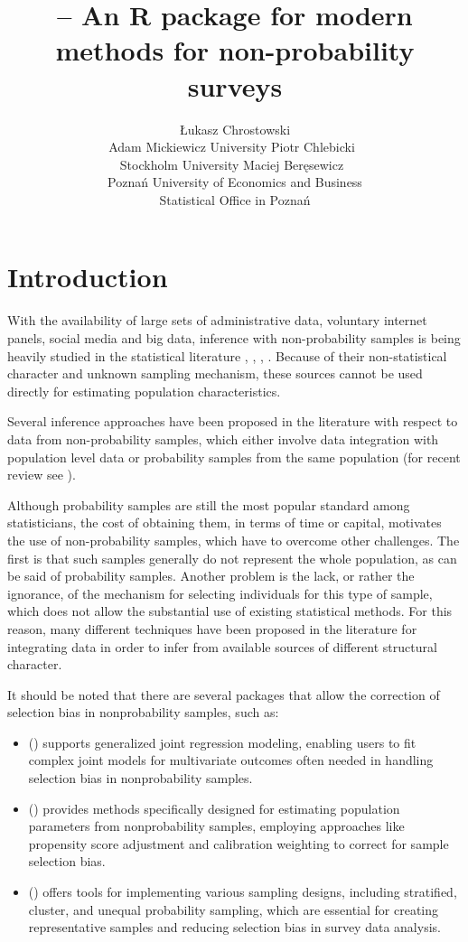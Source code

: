 \documentclass[
]{jss}
\author{
Łukasz Chrostowski\\Adam Mickiewicz University \And Piotr
Chlebicki~\orcidlink{0009-0006-4867-7434}\\Stockholm University
\AND Maciej Beręsewicz~\orcidlink{0000-0002-8281-4301}\\Poznań
University of Economics and Business\\
Statistical Office in Poznań
}
\title{\pkg{nonprobsvy} -- An R package for modern methods for
non-probability surveys}
\begin{document}
\section{Introduction}\label{introduction}

With the availability of large sets of administrative data, voluntary
internet panels, social media and big data, inference with
non-probability samples is being heavily studied in the statistical
literature \cite{beaumont2020probability},
\cite{elliott_inference_2017}, \cite{berkesewicz2017two},
\cite{citro2014multiple}. Because of their non-statistical character and
unknown sampling mechanism, these sources cannot be used directly for
estimating population characteristics.

Several inference approaches have been proposed in the literature with
respect to data from non-probability samples, which either involve data
integration with population level data or probability samples from the
same population (for recent review see \cite{wu2022statistical}).

Although probability samples are still the most popular standard among
statisticians, the cost of obtaining them, in terms of time or capital,
motivates the use of non-probability samples, which have to overcome
other challenges. The first is that such samples generally do not
represent the whole population, as can be said of probability samples.
Another problem is the lack, or rather the ignorance, of the mechanism
for selecting individuals for this type of sample, which does not allow
the substantial use of existing statistical methods. For this reason,
many different techniques have been proposed in the literature for
integrating data in order to infer from available sources of different
structural character.

It should be noted that there are several packages that allow the
correction of selection bias in nonprobability samples, such as:

\begin{itemize}
\item {} (\cite{GJRM}) supports generalized joint regression modeling, enabling users to fit complex joint models for multivariate outcomes often needed in handling selection bias in nonprobability samples.
\item {} (\cite{NonProbEst}) provides methods specifically designed for estimating population parameters from nonprobability samples, employing approaches like propensity score adjustment and calibration weighting to correct for sample selection bias.
\item {} (\cite{sampling}) offers tools for implementing various sampling designs, including stratified, cluster, and unequal probability sampling, which are essential for creating representative samples and reducing selection bias in survey data analysis.
\end{itemize}
\end{document}
